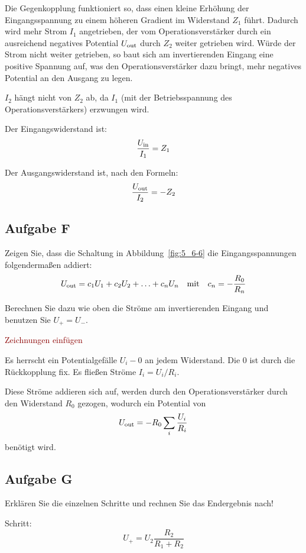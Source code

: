 Die Gegenkopplung funktioniert so, dass einen kleine Erhöhung der
Eingangsspannung zu einem höheren Gradient im Widerstand $Z_1$ führt. Dadurch
wird mehr Strom $I_1$ angetrieben, der vom Operationsverstärker durch ein
ausreichend negatives Potential $U_\text{out}$ durch $Z_2$ weiter getrieben wird.
Würde der Strom nicht weiter getrieben, so baut sich am invertierenden Eingang
eine positive Spannung auf, was den Operationsverstärker dazu bringt, mehr
negatives Potential an den Ausgang zu legen.

$I_2$ hängt nicht von $Z_2$ ab, da $I_1$ (mit der Betriebsspannung des
Operationsverstärkers) erzwungen wird. 

Der Eingangswiderstand ist:
\[
	\frac{U_\text{in}}{I_1} = Z_1
\]

Der Ausgangswiderstand ist, nach den Formeln:
\[
	\frac{U_\text{out}}{I_2} = - Z_2
\]

\subsection{Aufgabe F}

\begin{problem}
	Zeigen Sie, dass die Schaltung in Abbildung~\ref{fig:5_6-6} die
	Eingangsspannungen folgendermaßen addiert:
	\[
		U_\text{out} = c_1 U_1 + c_2 U_2 + \ldots + c_n U_n
		\quad \text{mit} \quad
		c_n = - \frac{R_0}{R_n}
	\]

	Berechnen Sie dazu wie oben die Ströme am invertierenden Eingang und
	benutzen Sie $U_+ = U_-$.
\end{problem}

\textcolor{darkred}{Zeichnungen einfügen}

Es herrscht ein Potentialgefälle $U_i - 0$ an jedem Widerstand. Die 0 ist
durch die Rückkopplung fix. Es fließen Ströme $I_i = U_i / R_i$.

Diese Ströme addieren sich auf, werden durch den Operationsverstärker durch den
Widerstand $R_0$ gezogen, wodurch ein Potential von
\[
	U_\text{out} = - R_0 \sum_i \frac{U_i}{R_i}
\]
benötigt wird.

\subsection{Aufgabe G}

\begin{problem}
	Erklären Sie die einzelnen Schritte und rechnen Sie das Endergebnis nach!
\end{problem}

Schritt:
\begin{equation}
	\label{eq:G1}
	U_+ = U_2 \frac{R_2}{R_1 + R_2}
\end{equation}


